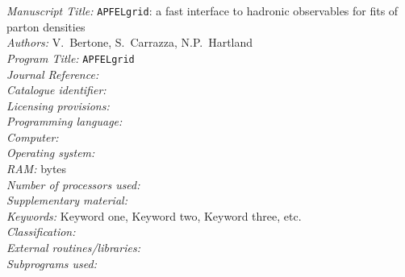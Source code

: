 \documentclass[preprint,12pt]{elsarticle}
\newcounter{bla}
\begin{document}
\begin{small}
\noindent
{\em Manuscript Title:} {\tt APFELgrid}: a fast interface to hadronic observables for
  fits of parton densities                                      \\
{\em Authors:} V.~Bertone, S.~Carrazza, N.P.~Hartland                                               \\
{\em Program Title:} {\tt APFELgrid}                                          \\
{\em Journal Reference:}                                      \\
{\em Catalogue identifier:}                                   \\
{\em Licensing provisions:}                                   \\
{\em Programming language:}                                   \\
{\em Computer:}                                               \\
{\em Operating system:}                                       \\
{\em RAM:} bytes                                              \\
{\em Number of processors used:}                              \\
{\em Supplementary material:}                                 \\
{\em Keywords:} Keyword one, Keyword two, Keyword three, etc.  \\
{\em Classification:}                                         \\
{\em External routines/libraries:}                            \\
{\em Subprograms used:}                                       \\

\end{small}
\end{document}
